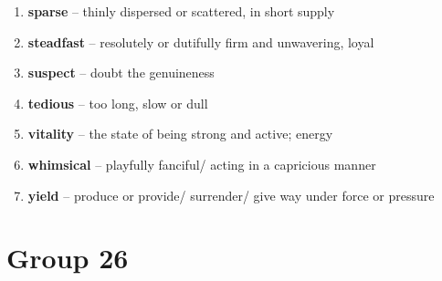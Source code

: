 \begin{enumerate}[wide,labelindent=0pt]
\item \textbf{sparse} -- thinly dispersed or scattered, in short supply
\item \textbf{steadfast} -- resolutely or dutifully firm and unwavering, loyal
\item \textbf{suspect} -- doubt the genuineness
\item \textbf{tedious} -- too long, slow or dull
\item \textbf{vitality} -- the state of being strong and active; energy
\item \textbf{whimsical} -- playfully fanciful/ acting in a capricious manner
\item \textbf{yield} -- produce or provide/ surrender/ give way under force or pressure
\end{enumerate}

\newpage
\section{Group 26}

